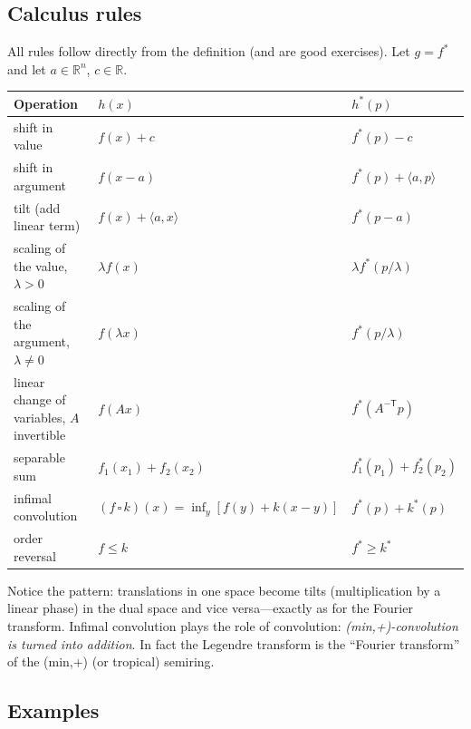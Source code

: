 \documentclass[11pt,a4paper]{article}
\newcommand{\R}{\mathbb{R}}
\newcommand{\ip}[2]{\langle #1,#2\rangle}
\theoremstyle{plain}
\theoremstyle{definition}
\theoremstyle{remark}
\begin{document}
\subsection{Calculus rules}

All rules follow directly from the definition (and are good exercises).
Let $g=f^*$ and let $a\in\R^n$, $c\in\R$.

\begin{center}
\begin{tabular}{@{}lll@{}}
\toprule
Operation & $h(x)$ & $h^*(p)$\\
\midrule
shift in value & $f(x)+c$ & $f^*(p)-c$\\
shift in argument & $f(x-a)$ & $f^*(p)+\ip{a}{p}$\\
tilt (add linear term) & $f(x)+\ip{a}{x}$ & $f^*(p-a)$\\
scaling of the value, $\lambda>0$ & $\lambda f(x)$ & $\lambda f^*(p/\lambda)$\\
scaling of the argument, $\lambda\ne0$ & $f(\lambda x)$ & $f^*(p/\lambda)$\\
linear change of variables, $A$ invertible & $f(Ax)$ & $f^*(A^{-\mathsf T}p)$\\
separable sum & $f_1(x_1)+f_2(x_2)$ & $f_1^*(p_1)+f_2^*(p_2)$\\
infimal convolution & $(f\,\square\,k)(x)=\inf_y[f(y)+k(x-y)]$ & $f^*(p)+k^*(p)$\\
order reversal & $f\le k$ & $f^*\ge k^*$\\
\bottomrule
\end{tabular}
\end{center}

Notice the pattern: translations in one space become tilts (multiplication by
a linear phase) in the dual space and vice versa---exactly as for the Fourier
transform.  Infimal convolution plays the role of convolution:
\emph{(min,+)-convolution is turned into addition}.  In fact the Legendre
transform is the ``Fourier transform'' of the (min,+) (or tropical) semiring.

\subsection{Examples}
\end{document}

